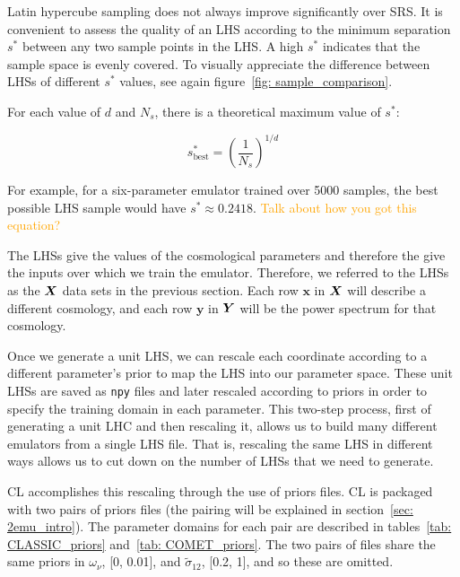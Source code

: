 Latin hypercube sampling does not always improve significantly over SRS. It is 
convenient to
assess the quality of an LHS according to the minimum separation $s^*$ 
between any two sample points in the LHS. A high $s^*$ indicates that 
the sample space is evenly covered. To visually appreciate the difference 
between LHSs of different $s^*$ values, see again
figure~\ref{fig: sample_comparison}.

For each value of $d$ and $N_s$, there is a theoretical maximum value of
$s^*$:

\begin{equation}
\label{eq: best_lhs_sep}
s^*_\text{best} = \left( \frac{1}{N_s} \right)^{1 / d}
\end{equation}

For example, for a six-parameter emulator trained over 5000 samples, the best
possible LHS sample would have $s^* \approx 0.2418$.
\textcolor{orange}{Talk about how you got this equation?}

The LHSs give the values of the cosmological parameters and therefore
the give the inputs over which we train the emulator.
Therefore, we referred to the LHSs as the
$\bm{X}$ data sets in the previous section. Each
row $\bm{x}$ in $\bm{X}$ will describe a different cosmology, and each
row $\bm{y}$ in $\bm{Y}$ will be the power spectrum for that cosmology.

Once we generate a unit LHS, we can rescale each coordinate according to a 
different parameter's prior to map the LHS into our parameter space.
These unit LHSs are saved as
\texttt{npy} files and later rescaled according to priors in order to
specify the training
domain in each parameter. This two-step process, first of generating a unit
LHC and then rescaling it, allows us to build many different emulators from a 
single LHS file. That is, rescaling the same LHS in different ways allows us
to cut down on the number of LHSs that we need to generate.



CL accomplishes this rescaling through the use of priors files.
CL is packaged with two pairs of priors files (the pairing will be explained
in section~\ref{sec: 2emu_intro}). The parameter domains for each pair are
described in tables~\ref{tab: CLASSIC_priors} and~\ref{tab: COMET_priors}. The two pairs of files share the same priors in
$\omega_\nu$, [0, 0.01], and $\tilde{\sigma}_{12}$, [0.2, 1], and so these are
omitted.

